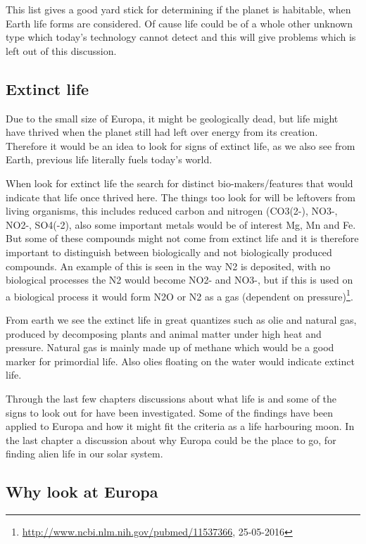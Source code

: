 This list gives a good yard stick for determining if the planet is habitable, when Earth life forms are considered. Of cause life could be of a whole other unknown type which today's technology cannot detect and this will give problems which is left out of this discussion.

\subsection{Extinct life}
Due to the small size of Europa, it might be geologically dead, but life might have thrived when the planet still had left over energy from its creation. Therefore it would be an idea to look for signs of extinct life, as we also see from Earth, previous life literally fuels today's world.

When look for extinct life the search for distinct bio-makers/features that would indicate that life once thrived here. The things too look for will be leftovers from living organisms, this includes reduced carbon and nitrogen (CO3(2-), NO3-, NO2-, SO4(-2), also some important metals would be of interest Mg, Mn and Fe. But some of these compounds might not come from extinct life and it is therefore important to distinguish between biologically and not biologically produced compounds. An example of this is seen in the way N2 is deposited, with no biological processes the N2 would become NO2- and NO3-, but if this is used on a biological process it would form N2O or N2 as a gas  (dependent on pressure)\footnote{\url{http://www.ncbi.nlm.nih.gov/pubmed/11537366}, 25-05-2016}.

From earth we see the extinct life in great quantizes such as olie and natural gas, produced by decomposing plants and animal matter under high heat and pressure. Natural gas is mainly made up of methane which would be a good marker for primordial life. Also olies floating on the water would indicate extinct life.

Through the last few chapters discussions about what life is and some of the signs to look out for have been investigated. Some of the findings have been applied to Europa and how it might fit the criteria as a life harbouring moon. In the last chapter a discussion about why Europa could be the place to go, for finding alien life in our solar system.

\subsection{Why look at Europa}

